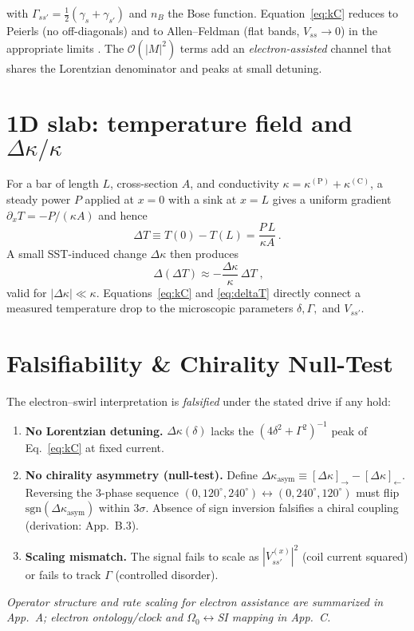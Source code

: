 \documentclass[aps,prb,preprint,amsmath,amssymb]{revtex4-2} %
\begin{document}
        with $\Gamma_{ss'}=\tfrac12(\gamma_s+\gamma_{s'})$ and $n_B$ the Bose function. Equation~\eqref{eq:kC} reduces to Peierls (no off-diagonals) and to Allen--Feldman (flat bands, $V_{ss}\!\to\!0$) in the appropriate limits \cite{Peierls1929,AllenFeldman1993,Simoncelli2022}. The $\mathcal O(|M|^2)$ terms add an \emph{electron-assisted} channel that shares the Lorentzian denominator and peaks at small detuning.

    \section{1D slab: temperature field and $\Delta\kappa/\kappa$}
        For a bar of length $L$, cross-section $A$, and conductivity $\kappa=\kappa^{(\mathrm P)}+\kappa^{(\mathrm C)}$, a steady power $P$ applied at $x=0$ with a sink at $x=L$ gives a uniform gradient $\partial_x T = -P/(\kappa A)$ and hence
        \begin{equation}
            \Delta T \equiv T(0)-T(L) = \frac{P\,L}{\kappa A}\,.
        \end{equation}
        A small SST-induced change $\Delta\kappa$ then produces
        \begin{equation}
            \boxed{\;\Delta(\Delta T) \approx -\frac{\Delta\kappa}{\kappa}\,\Delta T\;,}\label{eq:deltaT}
        \end{equation}
        valid for $|\Delta\kappa|\ll\kappa$. Equations~\eqref{eq:kC} and \eqref{eq:deltaT} directly connect a measured temperature drop to the microscopic parameters $\delta,\Gamma,$ and $V_{ss'}$.

    \section{Falsifiability \& Chirality Null-Test}
        \label{sec:falsifiability}
        The electron–swirl interpretation is \emph{falsified} under the stated drive if any hold:
        \begin{enumerate}
            \item \textbf{No Lorentzian detuning.} $\Delta\kappa(\delta)$ lacks the $(4\delta^2+\Gamma^2)^{-1}$ peak of Eq.~\eqref{eq:kC} at fixed current.
            \item \textbf{No chirality asymmetry (null-test).} Define $\Delta\kappa_\textrm{asym}\!\equiv\![\Delta\kappa]_{\rightarrow}-[\Delta\kappa]_{\leftarrow}$. Reversing the 3-phase sequence $(0,120^\circ,240^\circ)\!\leftrightarrow\!(0,240^\circ,120^\circ)$ must flip $\textrm{sgn}(\Delta\kappa_\textrm{asym})$ within $3\sigma$. Absence of sign inversion falsifies a chiral coupling (derivation: App.~B.3).
            \item \textbf{Scaling mismatch.} The signal fails to scale as $|V^{(x)}_{ss'}|^2$ (coil current squared) or fails to track $\Gamma$ (controlled disorder).
        \end{enumerate}
        \emph{Operator structure and rate scaling for electron assistance are summarized in App.~A; electron ontology/clock and $\Omega_0\!\leftrightarrow$SI mapping in App.~C.}
\end{document}
